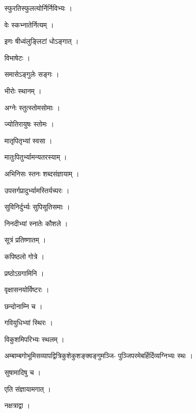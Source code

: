 \documentclass[10pt, openany]{book}
\begin{document}
\noindent स्फुरतिस्फुलत्योर्निर्निविभ्यः ।

\noindent वेः स्कभ्नातेर्नित्यम् ।

\noindent इणः षीध्वंलुङ्लिटां धोऽङ्गात् ।

\noindent विभाषेटः ।

\noindent समासेऽङ्गुलेः सङ्गः ।

\noindent भीरोः स्थानम् ।

\noindent अग्नेः स्तुत्स्तोमसोमाः ।

\noindent ज्योतिरायुषः स्तोमः ।

\noindent मातृपितृभ्यां स्वसा ।

\noindent मातुःपितुर्भ्यामन्यतरस्याम् ।

\noindent अभिनिसः स्तनः शब्दसंज्ञायाम् ।

\noindent उपसर्गप्रादुर्भ्यामस्तिर्यच्परः ।

\noindent सुविनिर्दुर्भ्यः सुपिसूतिसमाः ।

\noindent निनदीभ्यां स्नातेः कौशले ।

\noindent सूत्रं प्रतिष्णातम् ।

\noindent कपिष्ठलो गोत्रे ।

\noindent प्रष्ठोऽग्रगामिनि ।

\noindent वृक्षासनयोर्विष्टरः ।

\noindent छन्दोनाम्नि च ।

\noindent गवियुधिभ्यां स्थिरः ।

\noindent विकुशमिपरिभ्यः स्थलम् ।

\noindent अम्बाम्बगोभूमिसव्यापद्वित्रिकुशेकुशङ्क्वङ्गुमञ्जि- पुञ्जिपरमेबर्हिर्दिव्यग्निभ्यः स्थः ।

\noindent सुषामादिषु च ।

\noindent एति संज्ञायामगात् ।

\noindent नक्षत्राद्वा ।
\end{document}
